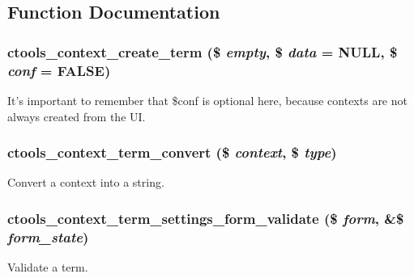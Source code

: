 \subsection{Function Documentation}
\hypertarget{contexts_2term_8inc_a687904b87d69e56ea41aeb94a7f56eaf}{
\subsubsection[{ctools\_\-context\_\-create\_\-term}]{\setlength{\rightskip}{0pt plus 5cm}ctools\_\-context\_\-create\_\-term (\$ {\em empty}, \/  \$ {\em data} = {\ttfamily NULL}, \/  \$ {\em conf} = {\ttfamily FALSE})}}
\label{contexts_2term_8inc_a687904b87d69e56ea41aeb94a7f56eaf}
It's important to remember that \$conf is optional here, because contexts are not always created from the UI. \hypertarget{contexts_2term_8inc_a5ce57bd056a6a2b577fd612fae21b04f}{
\subsubsection[{ctools\_\-context\_\-term\_\-convert}]{\setlength{\rightskip}{0pt plus 5cm}ctools\_\-context\_\-term\_\-convert (\$ {\em context}, \/  \$ {\em type})}}
\label{contexts_2term_8inc_a5ce57bd056a6a2b577fd612fae21b04f}
Convert a context into a string. \hypertarget{contexts_2term_8inc_a6d959df67d6875af2d0e98098375ac92}{
\subsubsection[{ctools\_\-context\_\-term\_\-settings\_\-form\_\-validate}]{\setlength{\rightskip}{0pt plus 5cm}ctools\_\-context\_\-term\_\-settings\_\-form\_\-validate (\$ {\em form}, \/  \&\$ {\em form\_\-state})}}
\label{contexts_2term_8inc_a6d959df67d6875af2d0e98098375ac92}
Validate a term. 

